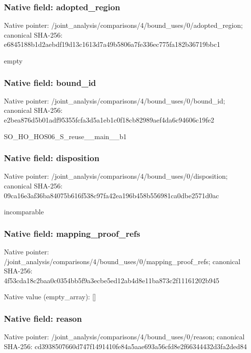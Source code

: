 \documentclass[10pt,a4paper]{article}
\begin{document}
\subsubsection{Native field: adopted\_\allowbreak{}region}
Native pointer: /joint\_\allowbreak{}analysis/comparisons/4/bound\_\allowbreak{}uses/0/adopted\_\allowbreak{}region; canonical SHA-256: e6845188b1d2aebdf19d13c1613d7a49b5806a7fe336ec775fa182b36719bbc1

\begingroup\raggedright\sloppy empty\par\endgroup

\subsubsection{Native field: bound\_\allowbreak{}id}
Native pointer: /joint\_\allowbreak{}analysis/comparisons/4/bound\_\allowbreak{}uses/0/bound\_\allowbreak{}id; canonical SHA-256: e2bea876d5b01adf95355fcfa3d5a1eb1c0f18cb82989aef4da6c94606c19fe2

\begingroup\raggedright\sloppy SO\_\allowbreak{}HO\_\allowbreak{}HOS06\_\allowbreak{}S\_\allowbreak{}reuse\_\allowbreak{}\_\allowbreak{}main\_\allowbreak{}\_\allowbreak{}b1\par\endgroup

\subsubsection{Native field: disposition}
Native pointer: /joint\_\allowbreak{}analysis/comparisons/4/bound\_\allowbreak{}uses/0/disposition; canonical SHA-256: 09ca16e3af36ba84075b616f538c97fa42ea196b458b556981ca0dbe2571d0ac

\begingroup\raggedright\sloppy incomparable\par\endgroup

\subsubsection{Native field: mapping\_\allowbreak{}proof\_\allowbreak{}refs}
Native pointer: /joint\_\allowbreak{}analysis/comparisons/4/bound\_\allowbreak{}uses/0/mapping\_\allowbreak{}proof\_\allowbreak{}refs; canonical SHA-256: 4f53cda18c2baa0c0354bb5f9a3ecbe5ed12ab4d8e11ba873c2f11161202b945

Native value (empty\_\allowbreak{}array): []

\subsubsection{Native field: reason}
Native pointer: /joint\_\allowbreak{}analysis/comparisons/4/bound\_\allowbreak{}uses/0/reason; canonical SHA-256: cd3938507660d747f1491410fe84a5aae693a56cfd8e2f66344432d3fa2ded84
\end{document}
